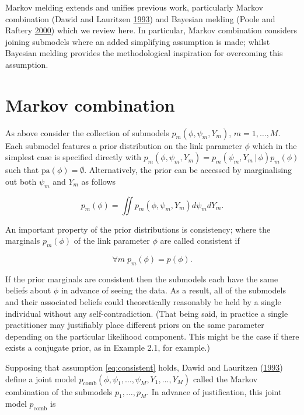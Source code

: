 \documentclass[11pt,]{book}
\begin{document}
Markov melding extends and unifies previous work, particularly Markov
combination (Dawid and Lauritzen
\protect\hyperlink{ref-dawid1993hyper}{1993}) and Bayesian melding
(Poole and Raftery \protect\hyperlink{ref-poole2000inference}{2000})
which we review here. In particular, Markov combination considers
joining submodels where an added simplifying assumption is made; whilst
Bayesian melding provides the methodological inspiration for overcoming
this assumption.

\section{Markov combination}\label{markov-combination}

As above consider the collection of submodels
\(p_m(\phi, \psi_m, Y_m)\), \(m = 1, \ldots, M\). Each submodel features
a prior distribution on the link parameter \(\phi\) which in the
simplest case is specified directly with
\(p_m(\phi, \psi_m, Y_m) = p_m(\psi_m, Y_m \, | \, \phi)p_m(\phi)\) such
that \(\text{pa}(\phi) = \emptyset\). Alternatively, the prior can be
accessed by marginalising out both \(\psi_m\) and \(Y_m\) as follows

\begin{equation}
p_m(\phi) = \iint p_m(\phi, \psi_m, Y_m) d\psi_m dY_m. \label{eq:priormarginal}
\end{equation}

An important property of the prior distributions is consistency; where
the marginals \(p_m(\phi)\) of the link parameter \(\phi\) are called
consistent if

\begin{equation}
\forall m \; p_m(\phi) = p(\phi). \label{eq:consistent}
\end{equation}

If the prior marginals are consistent then the submodels each have the
same beliefs about \(\phi\) in advance of seeing the data. As a result,
all of the submodels and their associated beliefs could theoretically
reasonably be held by a single individual without any
self-contradiction. (That being said, in practice a single practitioner
may justifiably place different priors on the same parameter depending
on the particular likelihood component. This might be the case if there
exists a conjugate prior, as in Example 2.1, for example.)

Supposing that assumption \eqref{eq:consistent} holds, Dawid and
Lauritzen (\protect\hyperlink{ref-dawid1993hyper}{1993}) define a joint
model
\(p_{\mathrm{comb}}(\phi, \psi_1, \ldots, \psi_M, Y_1, \ldots, Y_M)\)
called the Markov combination of the submodels \(p_1, \ldots, p_M\). In
advance of justification, this joint model \(p_{\mathrm{comb}}\) is
\end{document}

